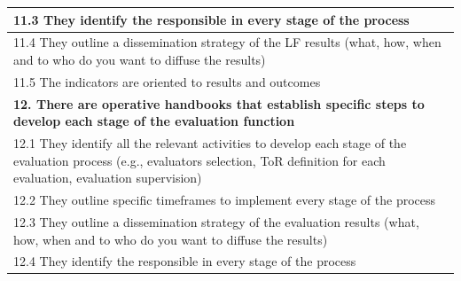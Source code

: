 \documentclass[
  10pt,
]{book}
\begin{document}
\begin{table}
\begin{tabular}[t]{l}
\hline
\hspace{1em}11.3 They identify the responsible in every stage of the process\\
\hline
\hspace{1em}11.4 They outline a dissemination strategy of the LF results (what, how, when and to who do you want to diffuse the results)\\
\hline
\hspace{1em}11.5 The indicators are oriented to results and outcomes\\
\hline
\multicolumn{1}{l}{\textbf{12. There are operative handbooks that establish specific steps to develop each stage of the evaluation function}}\\
\hline
\hspace{1em}12.1 They identify all the relevant activities to develop each stage of the evaluation process (e.g., evaluators selection, ToR definition for each evaluation, evaluation supervision)\\
\hline
\hspace{1em}12.2 They outline specific timeframes to implement every stage of the process\\
\hline
\hspace{1em}12.3 They outline a dissemination strategy of the evaluation results (what, how, when and to who do you want to diffuse the results)\\
\hline
\hspace{1em}12.4 They identify the responsible in every stage of the process\\
\hline
\end{tabular}
\end{table}
\end{document}
